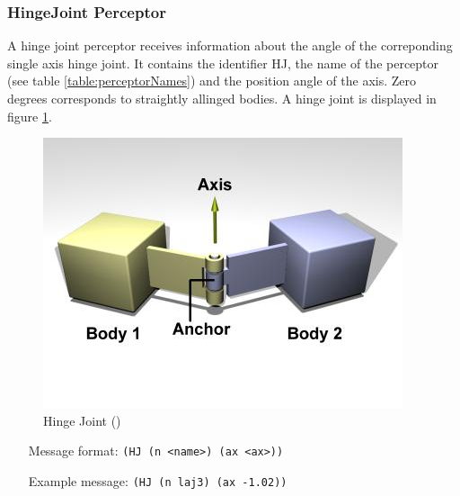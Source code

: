 \subsubsection{HingeJoint Perceptor}
A hinge joint perceptor receives information about the angle of the
correponding single axis hinge joint. It contains the identifier HJ, the name
of the perceptor (see table \ref{table:perceptorNames}) and the position angle of the axis. Zero
degrees corresponds to straightly allinged bodies. A hinge joint is displayed
in figure \ref{ode:hingejoint}. 

\begin{figure}[htbp]
  \begin{center}
	\includegraphics[scale=0.6]{fig/HingeJoint.png}
    \caption{Hinge Joint (\cite{ODEManual})}
    \label{ode:hingejoint}
  \end{center}
\end{figure}
\begin{itemize}
	\item[Message format:] \texttt{(HJ (n <name>) (ax <ax>))}
	\item[Example message:] \texttt{(HJ (n laj3) (ax -1.02))}
\end{itemize}

